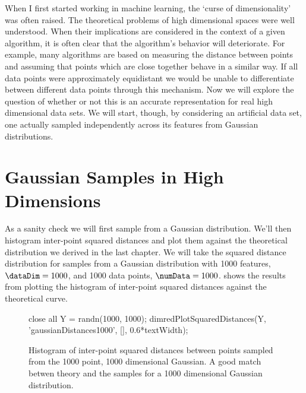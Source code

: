 When I first started working in machine learning, the `curse of
dimensionality' was often raised. The theoretical problems of high
dimensional spaces were well understood. When their implications are
considered in the context of a given algorithm, it is often clear that
the algorithm's behavior will deteriorate. For example, many
algorithms are based on measuring the distance between points and
assuming that points which are close together behave in a similar
way. If all data points were approximately equidistant we would be
unable to differentiate between different data points through this
mechanism. Now we will explore the question of whether or not this is
an accurate representation for real high dimensional data sets. We
will start, though, by considering an artificial data set, one
actually sampled independently across its features from Gaussian
distributions.


\section{Gaussian Samples in High Dimensions}

As a sanity check we will first sample from a Gaussian
distribution. We'll then histogram inter-point squared distances and
plot them against the theoretical distribution we derived in the last
chapter. We will take the squared distance distribution for samples
from a Gaussian distribution with 1000 features, $\dataDim=1000$, and
1000 data points, $\numData=1000$.  shows the
results from plotting the histogram of inter-point squared distances
against the theoretical curve.

\begin{figure}
  \begin{matlab}
    close all
    Y = randn(1000, 1000);
    dimredPlotSquaredDistances(Y, 'gaussianDistances1000', [], 0.6*textWidth);
  \end{matlab}
  \begin{center}
  \end{center}

  \caption{Histogram of inter-point squared distances between points sampled
    from the 1000 point, 1000 dimensional Gaussian. A good match betwen
    theory and the samples for a 1000 dimensional Gaussian
    distribution. \label{fig:gaussHighDim}}
\end{figure}

